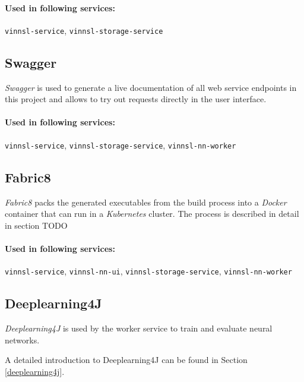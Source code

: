 \paragraph{Used in following
services:}\label{used-in-following-services-2}

\texttt{vinnsl-service}, \texttt{vinnsl-storage-service}

\subsection{Swagger}\label{swagger}

\emph{Swagger} is used to generate a live documentation of all web
service endpoints in this project and allows to try out requests
directly in the user interface.

\paragraph{Used in following
services:}\label{used-in-following-services-3}

\texttt{vinnsl-service}, \texttt{vinnsl-storage-service},
\texttt{vinnsl-nn-worker}

\subsection{Fabric8}\label{fabric8}

\emph{Fabric8} packs the generated executables from the build process
into a \emph{Docker} container that can run in a \emph{Kubernetes}
cluster. The process is described in detail in section TODO

\paragraph{Used in following
services:}\label{used-in-following-services-4}

\texttt{vinnsl-service}, \texttt{vinnsl-nn-ui},
\texttt{vinnsl-storage-service}, \texttt{vinnsl-nn-worker}

\subsection{Deeplearning4J}\label{deeplearning4j-1}

\emph{Deeplearning4J} is used by the worker service to train and
evaluate neural networks.

A detailed introduction to Deeplearning4J can be found in Section
\ref{deeplearning4j}.

